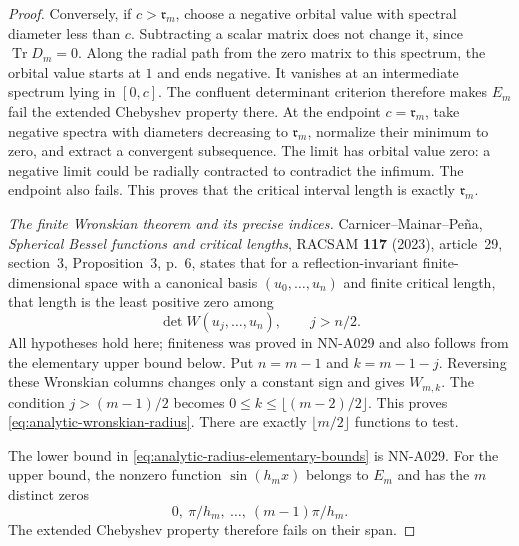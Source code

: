 \begin{proof}
Conversely, if $c>\mathfrak r_m$, choose a negative orbital value
with spectral diameter less than $c$. Subtracting a scalar matrix
does not change it, since $\operatorname{Tr}D_m=0$. Along the
radial path from the zero matrix to this spectrum, the orbital
value starts at $1$ and ends negative. It vanishes at an
intermediate spectrum lying in $[0,c]$. The confluent determinant
criterion therefore makes $E_m$ fail the extended Chebyshev
property there. At the endpoint $c=\mathfrak r_m$, take negative
spectra with diameters decreasing to $\mathfrak r_m$, normalize
their minimum to zero, and extract a convergent subsequence. The
limit has orbital value zero: a negative limit could be radially
contracted to contradict the infimum. The endpoint also fails.
This proves that the critical interval length is exactly
$\mathfrak r_m$.

\emph{The finite Wronskian theorem and its precise indices.}
Carnicer--Mainar--Pe\~na, \emph{Spherical Bessel functions and
critical lengths}, RACSAM \textbf{117} (2023), article~29,
section~3, Proposition~3, p.~6, states that for a
reflection-invariant finite-dimensional space with a canonical
basis $(u_0,\ldots,u_n)$ and finite critical length, that length is
the least positive zero among
\[
                 \det W(u_j,\ldots,u_n),\qquad j>n/2.
\]
All hypotheses hold here; finiteness was proved in NN-A029 and
also follows from the elementary upper bound below. Put $n=m-1$
and $k=m-1-j$. Reversing these Wronskian columns changes only a
constant sign and gives $W_{m,k}$. The condition $j>(m-1)/2$
becomes $0\le k\le\lfloor(m-2)/2\rfloor$. This proves
\eqref{eq:analytic-wronskian-radius}. There are exactly
$\lfloor m/2\rfloor$ functions to test.

The lower bound in \eqref{eq:analytic-radius-elementary-bounds}
is NN-A029. For the upper bound, the nonzero function
$\sin(h_mx)$ belongs to $E_m$ and has the $m$ distinct zeros
\[
                0,\ \pi/h_m,\ \ldots,\ (m-1)\pi/h_m.
\]
The extended Chebyshev property therefore fails on their span.


\end{proof}
